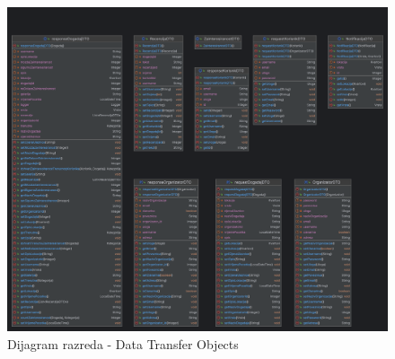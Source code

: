			\begin{figure}[H]
				\includegraphics[scale=0.12]{dijagramiKlasa/dtos.png} %
				\centering
				\caption{Dijagram razreda - Data Transfer Objects}
				\label{fig:promjene}
			\end{figure}
			
